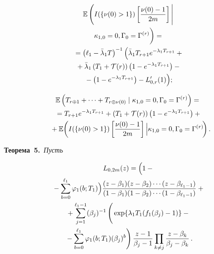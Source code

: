 \begin{multicols}{2}
\noindent
  \begin{multline*}
    \mathbb E  \left(  I(\{\nu(0) >1\})  \left[ \fr{\nu(0)-1}{2m} \right] 
\Bigg\vert \right.\\
\left. \kappa_{1,0}=0, \Gamma_0=\Gamma^{(r)} 
\vphantom{\fr{\nu(0)-1}{2m}}
\right) ={}\\
{}=
  \left(\ell_1-\bar\lambda_1 T\right)^{-1}  \Big( \bar\lambda_1 T_{r+1} e^{-\lambda_1
      T_{r+1}} +{}\\
      {}+ \bar\lambda_1 \left(T_1+\mathcal T(r)\right)\left(1-e^{-\lambda_1 T_{r+1}}\right)
    -{}\\
 {}-\left(1-e^{-\lambda_1 T_{r+1}}\right)-L_{0,r}'(1)    \Big);
  \end{multline*}
  
  \vspace*{-12pt}
  
  \noindent
  \begin{multline*}
    \mathbb {E}\left(  T_{r\oplus1} +\cdots+T_{r\oplus \nu(0)}\mid \kappa_{1,0}=0,
    \Gamma_0=\Gamma^{(r)}\right)={}\\
    {}= T_{r+1} e^{-\lambda_1 T_{r+1}} +
    \left(T_1+\mathcal T(r)\right)\left(1-e^{-\lambda_1 T_{r+1}}\right) + {}\\
    {}+\mathbb{E}\! \left(
    I(\{\nu(0)>1\}) \left[ \displaystyle\frac{\displaystyle \nu(0)-1\mathstrut}{\displaystyle 2m\mathstrut} \right] \Big| \kappa_{1,0}=0,
    \Gamma_0=\Gamma^{(r)} \!\right).\hspace*{-6pt}
\end{multline*}


\noindent
\textbf{Теорема~5.}\
\textit{Пусть}

\vspace*{-6pt}

\noindent
  \begin{multline*}
    L_{0,2m}(z)=
    \Bigl(1-{}\\
    {}-\sum\limits_{b=0}^{\ell_1} \varphi_1(b; T_1)\Bigr)
      \fr{(z-\beta_{1})(z-\beta_2)\cdots(z-\beta_{\ell_1-1})}%
    {(1-\beta_{1})(1-\beta_2)\cdots (1-\beta_{\ell_1-1})}+{}\\
{} +\sum\limits_{j=1}^{\ell_1-1}(\beta_{j})^{-1}
    \left(
    \vphantom{\sum\limits_{b=0}^{\ell_1}} 
    \exp\{\lambda_{1} T_1(f_{1}(\beta_{j})-1)\}-{}\right.\\
\left.    {}-\sum\limits_{b=0}^{\ell_1} 
\varphi_1(b; T_1) (\beta_j)^b
    \right)
    \fr{z-1}{\beta_{j}-1}\prod\limits_{k\neq j}\fr{z-\beta_{k}}{\beta_{j}-
\beta_{k}}\,.
  \end{multline*}
  

\end{multicols}
